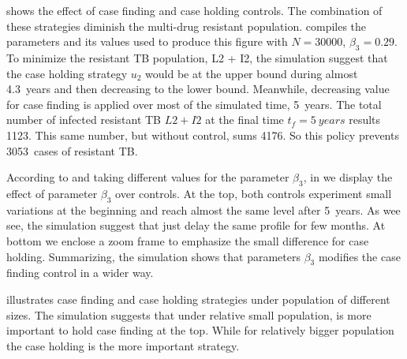 %
	 shows the effect of case finding and 
case holding controls. The combination of these strategies diminish the multi-drug resistant population.  compiles the 
parameters and its values used to produce this figure with
$N = \num{30000}$, $\beta_3 = \num{0.29}$. To minimize the resistant TB 
population, L2 + I2, the simulation suggest that the case holding strategy 
$u_2$ would be at the upper bound during almost \SI{4.3}{years} and then 
decreasing to the lower bound. Meanwhile, decreasing value for case finding
is applied over most of the simulated time, \SI{5}{years}. The total number 
of 
infected resistant TB $L2 + I2$  at the final time $t_f = \SI{5}{years}$ results
\num{1123}. This same number, but without control, sums 4176. So this policy
prevents \SI{3053}{cases} of resistant TB.

  According to  and taking different values
for the parameter $\beta_3$, in  we display 
the effect of parameter $\beta_3$ over controls. 
At the top, both controls experiment small variations 
at the beginning and reach almost the same level after \SI{5}{years}. 
As wee see, the simulation suggest that just delay the same profile for few 
months. At bottom we enclose  a zoom frame to emphasize the small difference for
case holding. Summarizing, the simulation shows that parameters $\beta_3$  
modifies the case finding control in a wider way.

	 illustrates case finding and case holding 
strategies under population of different sizes. The simulation suggests that
under relative small population, is more important to hold case finding at the 
top. While for relatively bigger population the case holding is the more 
important strategy.

